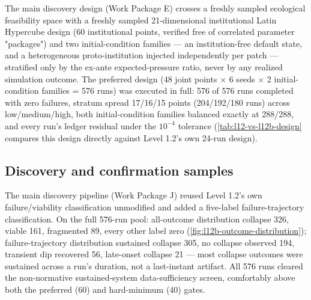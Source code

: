 The main discovery design (Work Package E) crosses a freshly sampled
ecological feasibility space with a freshly sampled 21-dimensional
institutional Latin Hypercube design (60 institutional points, verified
free of correlated parameter "packages") and two initial-condition
families --- an institution-free default state, and a heterogeneous
proto-institution injected independently per patch --- stratified only by
the ex-ante expected-pressure ratio, never by any realized simulation
outcome. The preferred design (48 joint points $\times$ 6 seeds
$\times$ 2 initial-condition families = 576 runs) was executed in full: 576
of 576 runs completed with zero failures, stratum spread 17/16/15 points
(204/192/180 runs) across low/medium/high, both initial-condition families
balanced exactly at 288/288, and every run's ledger residual under the
$10^{-4}$ tolerance (\cref{tab:l12-vs-l12b-design} compares this design
directly against Level 1.2's own 24-run design).

\subsection{Discovery and confirmation samples}
\label{sec:level12b-discovery-confirmation}

The main discovery pipeline (Work Package J) reused Level 1.2's own
failure/viability classification unmodified and added a five-label
failure-trajectory classification. On the full 576-run pool: all-outcome
distribution collapse 326, viable 161, fragmented 89, every other label
zero (\cref{fig:l12b-outcome-distribution}); failure-trajectory
distribution sustained collapse 305, no collapse observed 194, transient
dip recovered 56, late-onset collapse 21 --- most collapse outcomes were
sustained across a run's duration, not a last-instant artifact. All 576
runs cleared the non-normative sustained-system data-sufficiency screen,
comfortably above both the preferred (60) and hard-minimum (40) gates.

